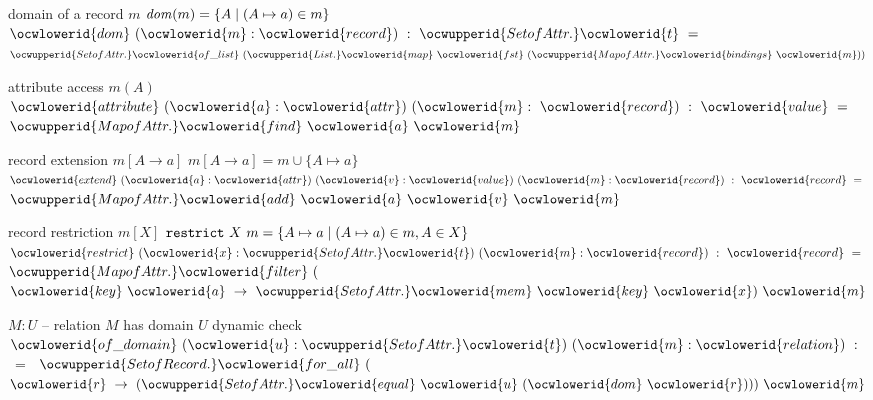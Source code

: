 \documentclass[12pt]{article}
\begin{document}
\ocwendcode{}\ocwindent{0.00em}
domain of a record $m$ 
\ocweol
\ocwindent{0.00em}
$\mathit{dom}(m)= \{ A \mid   (A \mapsto a) \in m \}$ 
\ocweol
\label{rellens.ml:201}%
\medskip
\ocwbegincode{}\ocwindent{0.00em}
~$\ocwlowerid{dom}~(\ocwlowerid{m}:\ocwlowerid{record})~:~\ocwupperid{SetofAttr.}\ocwlowerid{t}~=~$\ocweol
\ocwindent{1.00em}
$\ocwupperid{SetofAttr.}\ocwlowerid{of\_list}~(\ocwupperid{List.}\ocwlowerid{map}~\ocwlowerid{fst}~(\ocwupperid{MapofAttr.}\ocwlowerid{bindings}~\ocwlowerid{m}))$\medskip

\ocwendcode{}\ocwindent{0.00em}
attribute access $m(A)$ 
\ocweol
\label{rellens.ml:326}%
\medskip
\ocwbegincode{}\ocwindent{0.00em}
~$\ocwlowerid{attribute}~(\ocwlowerid{a}:\ocwlowerid{attr})~(\ocwlowerid{m}:~\ocwlowerid{record})~:~\ocwlowerid{value}~=~$\ocweol
\ocwindent{1.00em}
$\ocwupperid{MapofAttr.}\ocwlowerid{find}~\ocwlowerid{a}~\ocwlowerid{m}$\medskip

\ocwendcode{}\ocwindent{0.00em}
record extension $m[A \to a]$  
\ocweol
\ocwindent{0.00em}
$m[A \to a] = m \cup \{ A\mapsto a\}$  
\ocweol
\label{rellens.ml:477}%
\medskip
\ocwbegincode{}\ocwindent{0.00em}
~$\ocwlowerid{extend}~(\ocwlowerid{a}:\ocwlowerid{attr})~(\ocwlowerid{v}:\ocwlowerid{value})~(\ocwlowerid{m}:\ocwlowerid{record})~:~\ocwlowerid{record}~=~$\ocweol
\ocwindent{1.00em}
$\ocwupperid{MapofAttr.}\ocwlowerid{add}~\ocwlowerid{a}~\ocwlowerid{v}~\ocwlowerid{m}$\medskip

\ocwendcode{}\ocwindent{0.00em}
record restriction $m[X]$ 
\ocweol
\ocwindent{0.00em}
$\mathtt{restrict}\ X\ m = \{ A\mapsto a \mid (A \mapsto a) \in m, A \in X \}$ 
\ocweol
\label{rellens.ml:667}%
\medskip
\ocwbegincode{}\ocwindent{0.00em}
~$\ocwlowerid{restrict}~(\ocwlowerid{x}:\ocwupperid{SetofAttr.}\ocwlowerid{t})~(\ocwlowerid{m}:\ocwlowerid{record})~:~\ocwlowerid{record}~=~$\ocweol
\ocwindent{1.50em}
$\ocwupperid{MapofAttr.}\ocwlowerid{filter}~($~$\ocwlowerid{key}~\ocwlowerid{a}~\rightarrow{}~\ocwupperid{SetofAttr.}\ocwlowerid{mem}~\ocwlowerid{key}~\ocwlowerid{x})~\ocwlowerid{m}$\medskip

\ocwendcode{}\ocwindent{0.00em}
$M:U$ -- relation $M$ has domain $U$ 
\ocweol
\ocwindent{0.00em}
dynamic check 
\ocweol
\label{rellens.ml:840}%
\medskip
\ocwbegincode{}\ocwindent{0.00em}
~$\ocwlowerid{of\_domain}~(\ocwlowerid{u}:\ocwupperid{SetofAttr.}\ocwlowerid{t})~(\ocwlowerid{m}:\ocwlowerid{relation})~:~$~=~\ocweol
\ocwindent{1.50em}
$\ocwupperid{SetofRecord.}\ocwlowerid{for\_all}~($~$\ocwlowerid{r}~\rightarrow{}~(\ocwupperid{SetofAttr.}\ocwlowerid{equal}~\ocwlowerid{u}~(\ocwlowerid{dom}~\ocwlowerid{r})))~\ocwlowerid{m}$\medskip
\end{document}
